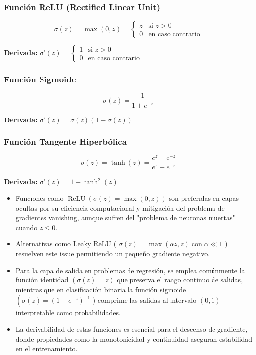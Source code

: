 \documentclass[12pt]{article}
\begin{document}
\subsubsection{Función ReLU (Rectified Linear Unit)}
\begin{equation}
\sigma(z) = \max(0, z) = 
\begin{cases} 
z & \text{si } z > 0 \\
0 & \text{en caso contrario}
\end{cases}
\end{equation}

\textbf{Derivada:} $\sigma'(z) = 
\begin{cases} 
1 & \text{si } z > 0 \\
0 & \text{en caso contrario}
\end{cases}$

\subsubsection{Función Sigmoide}
\begin{equation}
\sigma(z) = \frac{1}{1 + e^{-z}}
\end{equation}

\textbf{Derivada:} $\sigma'(z) = \sigma(z)(1 - \sigma(z))$

\subsubsection{Función Tangente Hiperbólica}
\begin{equation}
\sigma(z) = \tanh(z) = \frac{e^z - e^{-z}}{e^z + e^{-z}}
\end{equation}

\textbf{Derivada:} $\sigma'(z) = 1 - \tanh^2(z)$

\begin{itemize}
\item Funciones como $\operatorname{ReLU}(\sigma(z)=\max (0, z))$ son preferidas en capas ocultas por su eficiencia computacional y mitigación del problema de gradientes vanishing, aunque sufren del "problema de neuronas muertas" cuando $z \leq 0$. 
\item Alternativas como Leaky ReLU ( $\sigma(z)=\max (\alpha z, z) \operatorname{con} \alpha \ll 1$ ) resuelven este issue permitiendo un pequeño gradiente negativo. 
\item Para la capa de salida en problemas de regresión, se emplea comúnmente la función identidad $(\sigma(z)=z)$ que preserva el rango continuo de salidas, mientras que en clasificación binaria la función sigmoide $\left(\sigma(z)=\left(1+e^{-z}\right)^{-1}\right.$ ) comprime las salidas al intervalo $(0,1)$ interpretable como probabilidades. 
\item La derivabilidad de estas funciones es esencial para el descenso de gradiente, donde propiedades como la monotonicidad y continuidad aseguran estabilidad en el entrenamiento.
\end{itemize}
\end{document}
